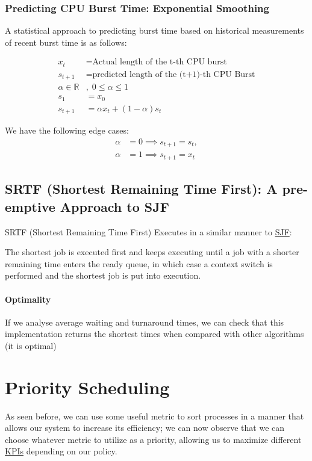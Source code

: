 \documentclass[openright, twoside]{report}
\theoremstyle{definition}
\theoremstyle{example}
\begin{document}
			\subsubsection{Predicting CPU Burst Time: Exponential Smoothing}
				A statistical approach to predicting burst time based on historical
				measurements of recent burst time is as follows:

				\begin{align*}
					x_t &= \text{Actual length of the t-th CPU burst} \\
					s_{t+1} &= \text{predicted length of the (t+1)-th CPU Burst} \\ 
					\alpha \in \mathbb{R}&, \; 0 \leq \alpha \leq 1 \\
					s_1 &= x_0 \\
					s_{t+1} &= \alpha x_t + (1-\alpha) s_t 
				\end{align*}

				We have the following edge cases:
				\begin{align}
					\alpha &= 0 \implies s_{t+1} = s_t, \\
					\alpha &= 1 \implies s_{t+1} = x_t
				\end{align}

		\subsection{SRTF (Shortest Remaining Time First): A pre-emptive Approach to SJF}
			\label{ssec:SRTF}
			SRTF (Shortest Remaining Time First) Executes in a similar manner to
			\hyperref[ssec:SJF]{SJF}:

			The shortest job is executed first and keeps executing until a job with a 
			shorter remaining time enters the ready queue, in which case a context 
			switch is performed and the shortest job is put into execution. 

			\paragraph{Optimality}
				If we analyse average waiting and turnaround times, we can check that 
				this implementation returns the shortest times when compared with other
				algorithms (it is optimal)

	\section{Priority Scheduling}
		As seen before, we can use some useful metric to sort processes in a manner that 
		allows our system to increase its efficiency; we can now observe that we can 
		choose whatever metric to utilize as a priority, allowing us to maximize different
		\hyperref[ssec:KPI]{KPIs} depending on our policy. \\
\end{document}
